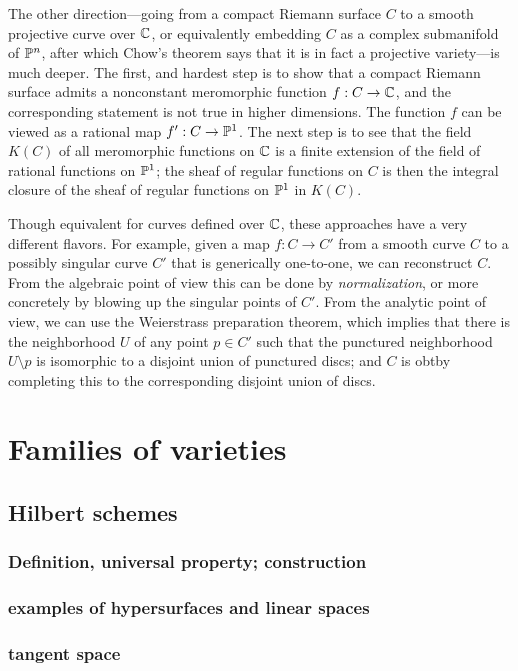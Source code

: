 The other direction---going from a compact Riemann surface $C$ to a smooth projective curve over ${\mathbb C}$, or equivalently embedding $C$ as a complex submanifold of ${\mathbb P}^n$, after which Chow's theorem says that it is in fact a projective variety---is much deeper. The first, and hardest step is to show that a compact Riemann surface admits a nonconstant meromorphic function $f:C \to {\mathbb C}$, and the corresponding statement is not true in higher dimensions. The function $f$ can be viewed as
a rational map $f': C\to {\mathbb P}^{1}$. The next step is to see that the field $K(C)$ of all meromorphic functions
on ${\mathbb C}$ is a finite extension of the field of rational functions on ${\mathbb P}^{1}$; the sheaf of regular functions on $C$ is then the integral closure of the sheaf of regular functions on ${\mathbb P}^{1}$ in $K(C)$.

Though equivalent for curves defined over ${\mathbb C}$, these approaches have a very different flavors. For example,
given a map  $f: C\to C'$ from a smooth curve $C$ to a possibly singular curve $C'$ that is generically one-to-one, we can reconstruct $C$.
From the algebraic point of view this can be done by \emph{normalization}, or more concretely by blowing up the singular points of $C'$. From the analytic point of view, we can use the Weierstrass preparation theorem, which implies that there is the neighborhood $U$ of any point $p\in C'$ such that the punctured neighborhood $U \setminus p$ is isomorphic to a disjoint union of punctured discs; and $C$ is obtby completing this to the corresponding disjoint union of discs.

\section{Families of varieties}

\subsection{Hilbert schemes}

\subsubsection{Definition, universal property; construction}

\subsubsection{examples of hypersurfaces and linear spaces}

\subsubsection{tangent space}

